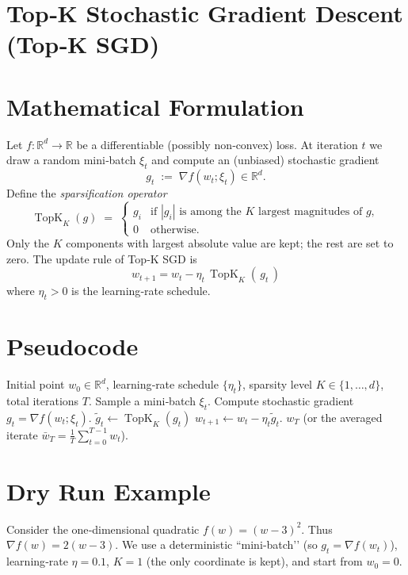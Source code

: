\documentclass{article}
\newcommand{\TopK}[2]{\operatorname{TopK}_{#1}(#2)} %
\begin{document}
\section*{Top‑K Stochastic Gradient Descent (Top‑K SGD)}

\section*{Mathematical Formulation}
Let $f:\mathbb{R}^{d}\rightarrow\mathbb{R}$ be a differentiable (possibly non‑convex) loss.  
At iteration $t$ we draw a random mini‑batch $\xi_t$ and compute an (unbiased) stochastic gradient
\[
g_t \;:=\; \nabla f(w_t;\xi_t)\in\mathbb{R}^{d}.
\]
Define the \emph{sparsification operator}
\[
\TopK{K}{g}\;=\; \begin{cases}
g_i & \text{if }|g_i|\text{ is among the $K$ largest magnitudes of }g,\\
0   & \text{otherwise.}
\end{cases}
\]
Only the $K$ components with largest absolute value are kept; the rest are set to zero.
The update rule of Top‑K SGD is
\[
\boxed{ \; w_{t+1}= w_t - \eta_t \,\TopK{K}{\,g_t\,}\; } \tag{1}
\]
where $\eta_t>0$ is the learning‑rate schedule.  

\section*{Pseudocode}
\begin{algorithm}[H]
\caption{Top‑K SGD}
\begin{algorithmic}[1]
\REQUIRE Initial point $w_0\in\mathbb{R}^d$, learning‑rate schedule $\{\eta_t\}$, sparsity level $K\in\{1,\dots,d\}$, total iterations $T$.
    \STATE Sample a mini‑batch $\xi_t$.
    \STATE Compute stochastic gradient $g_t=\nabla f(w_t;\xi_t)$.
    \STATE $\displaystyle \tilde g_t \gets \TopK{K}{g_t}$ \hfill{}
    \STATE $w_{t+1}\gets w_t - \eta_t \tilde g_t$.
\ENDFOR
\RETURN $w_T$ (or the averaged iterate $\bar w_T=\frac1T\sum_{t=0}^{T-1}w_t$).
\end{algorithmic}
\end{algorithm}

\section*{Dry Run Example}
Consider the one‑dimensional quadratic $f(w)=(w-3)^2$.  
Thus $\nabla f(w)=2(w-3)$.  We use a deterministic “mini‑batch’’ (so $g_t=\nabla f(w_t)$), learning‑rate $\eta=0.1$, $K=1$ (the only coordinate is kept), and start from $w_0=0$.
\end{document}
